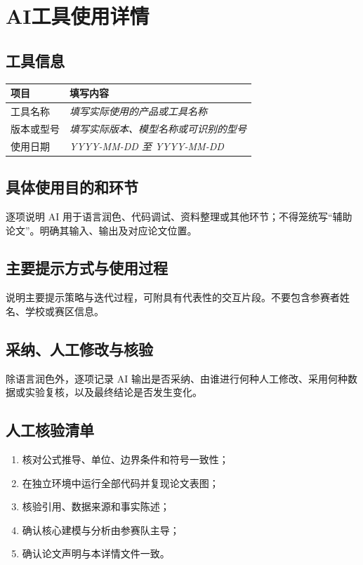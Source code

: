 \documentclass[11pt]{ctexart}
\begin{document}
\section*{AI工具使用详情}

\subsection*{工具信息}
\noindent
\begin{tabularx}{\textwidth}{@{}XX@{}}
  \toprule
  项目 & 填写内容 \\
  \midrule
  工具名称 & \textit{填写实际使用的产品或工具名称} \\
  版本或型号 & \textit{填写实际版本、模型名称或可识别的型号} \\
  使用日期 & \textit{YYYY-MM-DD 至 YYYY-MM-DD} \\
  \bottomrule
\end{tabularx}

\subsection*{具体使用目的和环节}
逐项说明 AI 用于语言润色、代码调试、资料整理或其他环节；不得笼统写“辅助论文”。明确其输入、输出及对应论文位置。

\subsection*{主要提示方式与使用过程}
说明主要提示策略与迭代过程，可附具有代表性的交互片段。不要包含参赛者姓名、学校或赛区信息。

\subsection*{采纳、人工修改与核验}
除语言润色外，逐项记录 AI 输出是否采纳、由谁进行何种人工修改、采用何种数据或实验复核，以及最终结论是否发生变化。

\subsection*{人工核验清单}
\begin{enumerate}[label=\arabic*)]
  \item 核对公式推导、单位、边界条件和符号一致性；
  \item 在独立环境中运行全部代码并复现论文表图；
  \item 核验引用、数据来源和事实陈述；
  \item 确认核心建模与分析由参赛队主导；
  \item 确认论文声明与本详情文件一致。
\end{enumerate}
\end{document}
